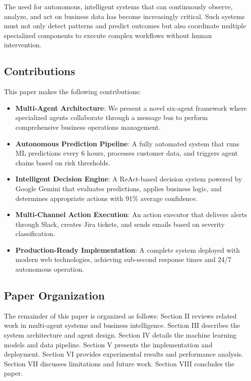\documentclass[conference]{IEEEtran}
\begin{document}
The need for autonomous, intelligent systems that can continuously observe, analyze, and act on business data has become increasingly critical. Such systems must not only detect patterns and predict outcomes but also coordinate multiple specialized components to execute complex workflows without human intervention.

\subsection{Contributions}
This paper makes the following contributions:

\begin{itemize}
\item \textbf{Multi-Agent Architecture}: We present a novel six-agent framework where specialized agents collaborate through a message bus to perform comprehensive business operations management.

\item \textbf{Autonomous Prediction Pipeline}: A fully automated system that runs ML predictions every 6 hours, processes customer data, and triggers agent chains based on risk thresholds.

\item \textbf{Intelligent Decision Engine}: A ReAct-based decision system powered by Google Gemini that evaluates predictions, applies business logic, and determines appropriate actions with 91\% average confidence.

\item \textbf{Multi-Channel Action Execution}: An action executor that delivers alerts through Slack, creates Jira tickets, and sends emails based on severity classification.

\item \textbf{Production-Ready Implementation}: A complete system deployed with modern web technologies, achieving sub-second response times and 24/7 autonomous operation.
\end{itemize}

\subsection{Paper Organization}
The remainder of this paper is organized as follows: Section II reviews related work in multi-agent systems and business intelligence. Section III describes the system architecture and agent design. Section IV details the machine learning models and data pipeline. Section V presents the implementation and deployment. Section VI provides experimental results and performance analysis. Section VII discusses limitations and future work. Section VIII concludes the paper.
\end{document}
